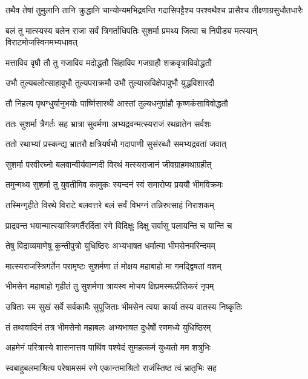 \fourlineindentedshloka
{तथैव तेषां तुमुलानि तानि}
{क्रुद्धानि चान्योन्यमभिद्रवन्ति}
{गदासिपट्टैश्च परश्वथैश्च}
{प्रासैश्च तीक्ष्णाग्रसुधौतधारैः}


\fourlineindentedshloka
{बलं तु मात्स्यस्य बलेन राजा}
{सर्वं त्रिगर्ताधिपतिः सुशर्मा}
{प्रमथ्य जित्वा च निपीड्य मत्स्यान्}
{विराटमोजस्विनमभ्यधावत्}


\twolineshloka
{मत्ताविव वृषौ तौ तु गजाविव मदोद्धतौ}
{सिंहाविव गजग्राहौ शक्रवृत्राविवोद्धतौ}


\twolineshloka
{उभौ तुल्यबलोत्साहावुभौ तुल्यपराक्रमौ}
{उभौ तुल्यास्रविक्षेपावुभौ युद्धविशारदौ}


\twolineshloka
{तौ निहत्य पृथग्धुर्यानुभयोः पार्ष्णिसारथी}
{आस्तां तुल्यधनुर्ग्राहौ कृष्णकंसाविवोद्धतौ}


\twolineshloka
{ततः सुशर्मा त्रैगर्तः सह भ्रात्रा सुवर्मणा}
{अभ्यद्रवन्मत्स्यराजं रथव्रातेन सर्वशः}


\twolineshloka
{ततो रथाभ्यां प्रस्कन्द्य भ्रातरौ क्षत्रियर्षभौ}
{गदापाणी सुसंरब्धौ समभ्यद्रवतां जवात्}


\twolineshloka
{सुशर्मा परवीरघ्नो बलवान्वीर्यवान्गदी}
{विरथं मत्स्यराजानं जीवग्राहमथाग्रहीत्}


\twolineshloka
{तमुन्मथ्य सुशर्मा तु युवतीमिव कामुकः}
{स्यन्दनं स्वं समारोप्य प्रययौ भीमविक्रमः}


\twolineshloka
{तस्मिन्गृहीते विरथे विराटे बलवत्तरे}
{बलं सर्वं विभग्नं तन्निरुत्साहं निराशकम्}


\twolineshloka
{प्राद्रवन्त भयान्मात्स्यास्त्रिगर्तैरर्दिता रणे}
{विदिक्षुः दिक्षु सर्वासु पलायन्ति च यान्ति च}


\twolineshloka
{तेषु विद्राव्यमाणेषु कुन्तीपुत्रो युधिष्ठिरः}
{अभ्यभाषत धर्मात्मा भीमसेनमरिन्दमम्}


\twolineshloka
{मात्स्यराजस्त्रिगर्तेन परामृष्टः सुशर्मणा}
{तं मोक्षय महाबाहो मा गमद्द्विषतां वशम्}


\twolineshloka
{भीमसेन महाबाहो गृहीतं तु सुशर्मणा}
{त्रायस्व मोचय क्षिप्रमस्मत्प्रीतिकरं नृपम्}


\twolineshloka
{उषिताः स्म सुखं सर्वे सर्वकामैः सुपूजिताः}
{भीमसेन त्वया कार्या तस्य वातस्य निष्कृतिः}



\twolineshloka
{तं तथावादिनं तत्र भीमसेनो महाबलः}
{अभ्यभाषत दुर्धर्षो रणमध्ये युधिष्ठिरम्}


\twolineshloka
{अहमेनं परित्रास्ये शासनात्तव पार्थिव}
{पश्येदं सुमहत्कर्म युध्यतो मम शत्रुभिः}


\twolineshloka
{स्वबाहुबलमाश्रित्य परेषामसमं रणे}
{एकान्तमाश्रितो राजंस्तिष्ठ त्वं भ्रातृभिः सह}


